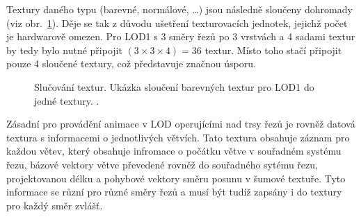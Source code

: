 Textury daného typu (barevné, normálové, \dots) jsou následně sloučeny dohromady (viz obr.~\ref{fig:joinTextures}). Děje se tak z důvodu ušetření texturovacích jednotek, jejichž počet je hardwarově omezen. Pro LOD1 s 3 směry řezů po 3 vrstvách a 4 sadami textur by tedy bylo nutné připojit $ (3 \times 3 \times 4 ) = 36 $ textur. Místo toho stačí připojit pouze 4 sloučené textury, což představuje značnou úsporu.
%
\begin{figure}[!hbt]
\begin{center}
\end{center}
\caption[Slučování textur]%
{Slučování textur. Ukázka sloučení barevných textur pro LOD1 do jedné textury. .\label{fig:joinTextures}
}
\end{figure}

Zásadní pro provádění animace v LOD operujícími nad trsy řezů je rovněž datová textura s informacemi o jednotlivých větvích. Tato textura obsahuje záznam pro každou větev, který obsahuje infromace o počátku větve v souřadném systému řezu, bázové vektory větve převedené rovněž do souřadného sytému řezu, projektovanou délku a pohybové vektory směru posunu v šumové textuře. Tyto informace se různí pro různé směry řezů a musí být tudíž zapsány i do textury pro každý směr zvlášť.


